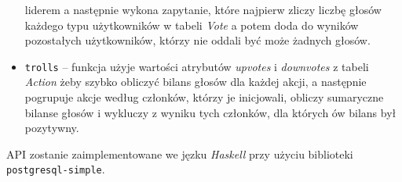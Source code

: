 \documentclass[12pt]{article}
\begin{document}
\begin{itemize}
{          liderem a następnie wykona zapytanie, które najpierw zliczy liczbę
          głosów każdego typu użytkowników w tabeli \textit{Vote} a potem
          doda do wyników pozostałych użytkowników, którzy nie oddali być może 
          żadnych głosów.}
    \item{\texttt{trolls} -- funkcja użyje wartości atrybutów \textit{upvotes} i 
          \textit{downvotes} z tabeli \textit{Action} żeby szybko obliczyć bilans
          głosów dla każdej akcji, a następnie pogrupuje akcje według członków,
          którzy je inicjowali, obliczy sumaryczne bilanse głosów i wykluczy
          z wyniku tych członków, dla których ów bilans był pozytywny.}
\end{itemize}

API zostanie zaimplementowane we jęzku \textit{Haskell} przy użyciu biblioteki
\texttt{postgresql-simple}.
\end{document}
